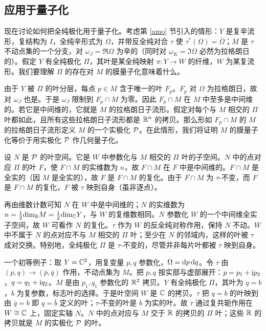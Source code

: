 \subsection{应用于量子化}\label{scbq}

现在讨论如何把全纯极化用于量子化。考虑第 \ref{amo} 节引入的情形：$Y$ 是复辛流形，复结构为 $I$，全纯辛形式为 $\Omega$，并带反全纯对合 $\tau$ 使 $\tau^*(\Omega)=\bar\Omega$；$M$ 是 $\tau$ 不动点集的一个分支，对 $\omega_J=\Re\Omega$ 为辛的（同时对 $\omega_K=\Im\Omega$ 必然为拉格朗日的）。假定 $Y$ 有全纯极化 $\varPi$，其叶是某全纯映射 $\pi:Y\to W$ 的纤维，$W$ 为某复流形。我们要理解 $\varPi$ 的存在对 $M$ 的膜量子化意味着什么。

由于 $Y$ 被 $\varPi$ 的叶分层，每点 $p\in M$ 含于唯一的叶 $F_p$。$F_p$ 对 $\Omega$ 为拉格朗日，故对 $\omega_J$ 也是。于是 $\omega_J$ 限制到 $F_p\cap M$ 为零。因此 $F_p\cap M$ 在 $M$ 中至多是中间维的。若它是中间维的，它就是 $M$ 的拉格朗日子流形。假定对每个与 $M$ 相交的 $\varPi$ 叶都如此，且所有这些拉格朗日子流形都是 $\R^n$ 的拷贝。那么形如 $F_p\cap M$ 的 $M$ 的拉格朗日子流形定义 $M$ 的一个实极化 $\P$。在此情形，我们将证明 $M$ 的膜量子化等价于用实极化 $\P$ 作几何量子化。

设 $N$ 是 $\P$ 的叶空间。它是 $W$ 中参数化与 $M$ 相交的 $\varPi$ 叶的子空间。$N$ 中的点对应 $\varPi$ 的叶 $F$，使 $F\cap M$ 的实维数为 $n$，故 $F\cap M$ 在 $F$ 中是中间维的。$F\cap M$ 是全实的（因 $M$ 是全实的），故 $F$ 是 $F\cap M$ 的复化。由于 $F\cap M$ 为 $\tau$-不变，而 $F$ 是 $F\cap M$ 的复化，$F$ 被 $\tau$ 映到自身（虽非逐点）。

再由维数计数可知 $N$ 在 $W$ 中是中间维的；$N$ 的实维数为 $n=\frac12\dim_\R M=\frac12\dim_\C Y$，与 $W$ 的复维数相同。$N$ 参数化 $W$ 的一个中间维全实子空间，故 $W$ 可看作 $N$ 的复化。$\tau$ 作为 $W$ 的反全纯对称作用，保持 $N$ 不动。$W$ 中不属于 $N$ 的点对应不与 $M$ 相交的 $\varPi$ 叶；至少在 $N$ 的邻域内，这样的叶被 $\tau$ 成对交换。特别地，全纯极化 $\varPi$ 是 $\tau$-不变的，尽管并非每片叶都被 $\tau$ 映到自身。

一个初等例子：取 $Y=\C^2$，用复变量 $p,q$ 参数化，$\Omega=\d p\,\d q$。令 $\tau$ 由 $(p,q)\to(\bar p,\bar q)$ 作用，不动点集为 $M$。把 $p,q$ 按实部与虚部展开：$p=p_1+\i p_2$，$q=q_1+\i q_2$。$M$ 是由 $p_1,q_1$ 参数化的 $\R^2$ 拷贝。$Y$ 有全纯极化 $\varPi$，其叶为 $q=b$，$b$ 为复参数，标志叶的选择。于是叶空间 $W$ 是 $\C$ 的拷贝。$\tau$ 把 $q=b$ 的叶映到由 $\bar q=b$ 即 $q=\bar b$ 定义的叶；$\tau$-不变的叶是 $b$ 为实的叶。故 $\tau$ 通过复共轭作用在 $W\cong\C$ 上，固定实轴 $N$。$N$ 中的点对应与 $M$ 交于 $\R$ 的拷贝的 $\varPi$ 叶；这些 $\R$ 的拷贝就是 $M$ 的实极化 $\P$ 的叶。

